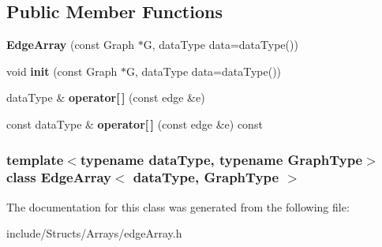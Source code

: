 \subsection*{Public Member Functions}
\begin{DoxyCompactItemize}
\item 
\hypertarget{class_edge_array_ac3121d00bfd5646863cacbd0b69b0fa6}{
{\bfseries EdgeArray} (const Graph $\ast$G, dataType data=dataType())}
\label{class_edge_array_ac3121d00bfd5646863cacbd0b69b0fa6}

\item 
\hypertarget{class_edge_array_a712d0daaeff14bd1d8b042f873e3ed93}{
void {\bfseries init} (const Graph $\ast$G, dataType data=dataType())}
\label{class_edge_array_a712d0daaeff14bd1d8b042f873e3ed93}

\item 
\hypertarget{class_edge_array_a0aae1b3d5cbf982b5302cd7631a998f0}{
dataType \& {\bfseries operator\mbox{[}$\,$\mbox{]}} (const edge \&e)}
\label{class_edge_array_a0aae1b3d5cbf982b5302cd7631a998f0}

\item 
\hypertarget{class_edge_array_aeaccf455dc411562b49865f491b887ca}{
const dataType \& {\bfseries operator\mbox{[}$\,$\mbox{]}} (const edge \&e) const }
\label{class_edge_array_aeaccf455dc411562b49865f491b887ca}

\end{DoxyCompactItemize}
\subsubsection*{template$<$typename dataType, typename GraphType$>$ class EdgeArray$<$ dataType, GraphType $>$}



The documentation for this class was generated from the following file:\begin{DoxyCompactItemize}
\item 
include/Structs/Arrays/edgeArray.h\end{DoxyCompactItemize}
